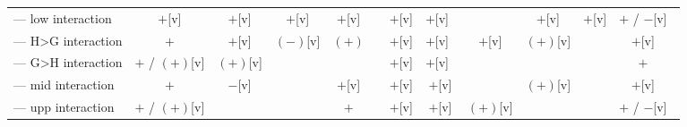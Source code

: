 \begin{landscape}
\begin{table}[!htbp]
\begin{tabular}{lccccccccccc}
--- low interaction       & $+$[v]         & $+$[v]   & $+$[v]   & $+$[v] &        & $+$[v] & $+$[v]~  &          & $+$[v]   & $+$[v]   & $+$ / $-$[v]~ \\
--- H>G interaction       & $+$            & $+$[v]   & $(-)$[v] & $(+)$  &        & $+$[v] & $+$[v]~  & $+$[v]   & $(+)$[v] &          & $+$[v]~ \\
--- G>H interaction       & $+$ / $(+)$[v] & $(+)$[v] &          &        &        & $+$[v] & $+$[v]~  &          &          &          & $+$~ \\
--- mid interaction       & $+$            & $-$[v]   &          & $+$[v] &        & $+$[v] & $+$[v]   &          & $(+)$[v] &          & $+$[v]~ \\
--- upp interaction       & $+$ / $(+)$[v] &          &          & $+$    &        & $+$[v] & $+$[v]   & $(+)$[v] &          &          & $+$ / $-$[v]~ \\
\bottomrule
\end{tabular}
\end{table}
\end{landscape}
